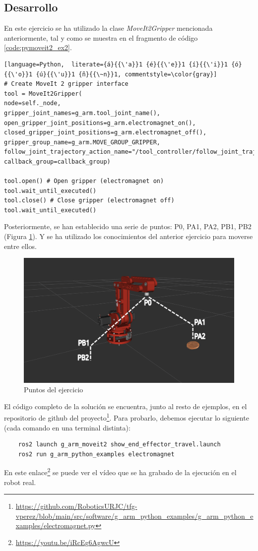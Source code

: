 \subsection*{Desarrollo}
\noindent En este ejercicio se ha utilizado la clase \textit{MoveIt2Gripper} mencionada anteriormente, tal y como 
se muestra en el fragmento de código \ref{code:pymoveit2_ex2}.
\begin{code}[ht!]
\begin{lstlisting}[language=Python,  literate={á}{{\'a}}1 {é}{{\'e}}1 {í}{{\'i}}1 {ó}{{\'o}}1 {ú}{{\'u}}1 {ñ}{{\~n}}1, commentstyle=\color{gray}]
# Create MoveIt 2 gripper interface
tool = MoveIt2Gripper(
node=self._node,
gripper_joint_names=g_arm.tool_joint_name(),
open_gripper_joint_positions=g_arm.electromagnet_on(),
closed_gripper_joint_positions=g_arm.electromagnet_off(),
gripper_group_name=g_arm.MOVE_GROUP_GRIPPER,
follow_joint_trajectory_action_name="/tool_controller/follow_joint_trajectory",
callback_group=callback_group)

tool.open() # Open gripper (electromagnet on)
tool.wait_until_executed()
tool.close() # Close gripper (electromagnet off)
tool.wait_until_executed()
\end{lstlisting}
\caption{Uso básico de PyMoveIt2 para moverse a un punto}
\label{code:pymoveit2_ex2}
\end{code}
\newpage
Posteriormente, se han establecido una serie de puntos: P0, PA1, PA2, PB1, PB2 (Figura \ref{fig:example_electromagnet_2}). Y se ha utilizado 
los conocimientos del anterior ejercicio para moverse entre ellos.
\begin{figure} [ht!]
    \begin{center}
        \includegraphics[width=12cm]{figs/ex2.png}
    \end{center}
    \caption{Puntos del ejercicio}
\label{fig:example_electromagnet_2}
\end{figure}


El código completo de la solución se encuentra, junto al resto de ejemplos, en el repositorio de github del 
proyecto\footnote{\url{https://github.com/RoboticsURJC/tfg-vperez/blob/main/src/software/g\_arm\_python_examples/g\_arm_python\_examples/electromagnet.py}}. Para 
probarlo, debemos ejecutar lo siguiente (cada comando en una terminal distinta):
\begin{verbatim}
    ros2 launch g_arm_moveit2 show_end_effector_travel.launch 
    ros2 run g_arm_python_examples electromagnet
\end{verbatim}
En este enlace\footnote{\url{https://youtu.be/iRcEg6AgwcU}} se puede ver el vídeo que se ha grabado de la ejecución en el robot real.